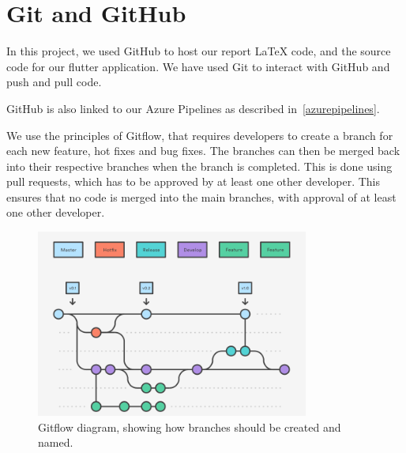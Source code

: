 \section{Git and GitHub}
In this project, we used GitHub to host our report LaTeX code, and the source code for our flutter application.
We have used Git to interact with GitHub and push and pull code. 

GitHub is also linked to our Azure Pipelines as described in~\autoref{azurepipelines}.

We use the principles of Gitflow, that requires developers to create a branch for each new feature, hot fixes and bug fixes. 
The branches can then be merged back into their respective branches when the branch is completed.
This is done using pull requests, which has to be approved by at least one other developer.
This ensures that no code is merged into the main branches, with approval of at least one other developer.

\begin{figure}[H]
    \centering
    \includegraphics[width=0.8\textwidth]{images/GitFlow.png}
    \caption{Gitflow diagram, showing how branches should be created and named.}
    \label{Gitflow}
\end{figure}

